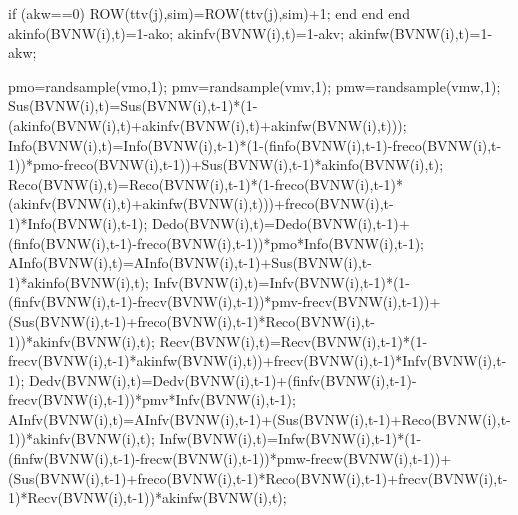                                                           if (akw==0)
                                                             ROW(ttv(j),sim)=ROW(ttv(j),sim)+1;
                                                          end
                                                     end                                           
                                          end
                                          akinfo(BVNW(i),t)=1-ako;
                                          akinfv(BVNW(i),t)=1-akv;
                                          akinfw(BVNW(i),t)=1-akw;
                                          
                                          pmo=randsample(vmo,1);
                                          pmv=randsample(vmv,1); 
                                          pmw=randsample(vmw,1);                                        
                                          Sus(BVNW(i),t)=Sus(BVNW(i),t-1)*(1-(akinfo(BVNW(i),t)+akinfv(BVNW(i),t)+akinfw(BVNW(i),t)));
                                          Info(BVNW(i),t)=Info(BVNW(i),t-1)*(1-(finfo(BVNW(i),t-1)-freco(BVNW(i),t-1))*pmo-freco(BVNW(i),t-1))+Sus(BVNW(i),t-1)*akinfo(BVNW(i),t);
                                          Reco(BVNW(i),t)=Reco(BVNW(i),t-1)*(1-freco(BVNW(i),t-1)*(akinfv(BVNW(i),t)+akinfw(BVNW(i),t)))+freco(BVNW(i),t-1)*Info(BVNW(i),t-1);
                                          Dedo(BVNW(i),t)=Dedo(BVNW(i),t-1)+(finfo(BVNW(i),t-1)-freco(BVNW(i),t-1))*pmo*Info(BVNW(i),t-1);
                                          AInfo(BVNW(i),t)=AInfo(BVNW(i),t-1)+Sus(BVNW(i),t-1)*akinfo(BVNW(i),t);                              
                                          Infv(BVNW(i),t)=Infv(BVNW(i),t-1)*(1-(finfv(BVNW(i),t-1)-frecv(BVNW(i),t-1))*pmv-frecv(BVNW(i),t-1))+(Sus(BVNW(i),t-1)+freco(BVNW(i),t-1)*Reco(BVNW(i),t-1))*akinfv(BVNW(i),t);
                                          Recv(BVNW(i),t)=Recv(BVNW(i),t-1)*(1-frecv(BVNW(i),t-1)*akinfw(BVNW(i),t))+frecv(BVNW(i),t-1)*Infv(BVNW(i),t-1);
                                          Dedv(BVNW(i),t)=Dedv(BVNW(i),t-1)+(finfv(BVNW(i),t-1)-frecv(BVNW(i),t-1))*pmv*Infv(BVNW(i),t-1);
                                          AInfv(BVNW(i),t)=AInfv(BVNW(i),t-1)+(Sus(BVNW(i),t-1)+Reco(BVNW(i),t-1))*akinfv(BVNW(i),t);
                                          Infw(BVNW(i),t)=Infw(BVNW(i),t-1)*(1-(finfw(BVNW(i),t-1)-frecw(BVNW(i),t-1))*pmw-frecw(BVNW(i),t-1))+(Sus(BVNW(i),t-1)+freco(BVNW(i),t-1)*Reco(BVNW(i),t-1)+frecv(BVNW(i),t-1)*Recv(BVNW(i),t-1))*akinfw(BVNW(i),t);
